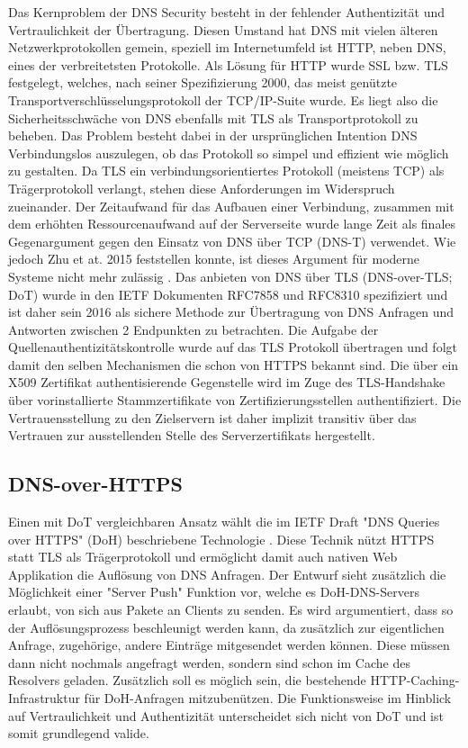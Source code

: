 Das Kernproblem der DNS Security besteht in der fehlender Authentizität und Vertraulichkeit der Übertragung. Diesen Umstand hat DNS mit vielen älteren Netzwerkprotokollen gemein, speziell im Internetumfeld ist HTTP, neben DNS, eines der verbreitetsten Protokolle. Als Lösung für HTTP wurde SSL bzw. TLS festgelegt, welches, nach seiner Spezifizierung 2000, das meist genützte Transportverschlüsselungsprotokoll der TCP/IP-Suite wurde. Es liegt also die Sicherheitsschwäche von DNS ebenfalls mit TLS als Transportprotokoll zu beheben. Das Problem besteht dabei in der ursprünglichen Intention DNS Verbindungslos auszulegen, ob das Protokoll so simpel und effizient wie möglich zu gestalten. Da TLS ein verbindungsorientiertes Protokoll (meistens TCP) als Trägerprotokoll verlangt, stehen diese Anforderungen im Widerspruch zueinander. Der Zeitaufwand für das Aufbauen einer Verbindung, zusammen mit dem erhöhten Ressourcenaufwand auf der Serverseite wurde lange Zeit als finales Gegenargument gegen den Einsatz von DNS über TCP (DNS-T) verwendet. Wie jedoch Zhu et at. 2015 feststellen konnte, ist dieses Argument für moderne Systeme nicht mehr zulässig \cite{Zhu2015}. Das anbieten von DNS über TLS (DNS-over-TLS; DoT) wurde in den IETF Dokumenten RFC7858\cite{Hu2016} und RFC8310\cite{Dickinson2018} spezifiziert und ist daher sein 2016 als sichere Methode zur Übertragung von DNS Anfragen und Antworten zwischen 2 Endpunkten zu betrachten. Die Aufgabe der Quellenauthentizitätskontrolle wurde auf das TLS Protokoll übertragen und folgt damit den selben Mechanismen die schon von HTTPS bekannt sind. Die über ein X509 Zertifikat authentisierende Gegenstelle wird im Zuge des TLS-Handshake über vorinstallierte Stammzertifikate von Zertifizierungsstellen authentifiziert. Die Vertrauensstellung zu den Zielservern ist daher implizit transitiv über das Vertrauen zur ausstellenden Stelle des Serverzertifikats hergestellt.        

\subsection{DNS-over-HTTPS}

Einen mit DoT vergleichbaren Ansatz wählt die im IETF Draft "DNS Queries over HTTPS" (DoH) beschriebene Technologie \cite{Mcmanus2018}. Diese Technik nützt HTTPS statt TLS als Trägerprotokoll und ermöglicht damit auch nativen Web Applikation die Auflösung von DNS Anfragen. Der Entwurf sieht zusätzlich die Möglichkeit einer "Server Push" Funktion vor, welche es DoH-DNS-Servers erlaubt, von sich aus Pakete an Clients zu senden. Es wird argumentiert, dass so der Auflösungsprozess beschleunigt werden kann, da zusätzlich zur eigentlichen Anfrage, zugehörige, andere Einträge mitgesendet werden können. Diese müssen dann nicht nochmals angefragt werden, sondern sind schon im Cache des Resolvers geladen. Zusätzlich soll es möglich sein, die bestehende HTTP-Caching-Infrastruktur für DoH-Anfragen mitzubenützen. Die Funktionsweise im Hinblick auf Vertraulichkeit und Authentizität unterscheidet sich nicht von DoT und ist somit grundlegend valide.

